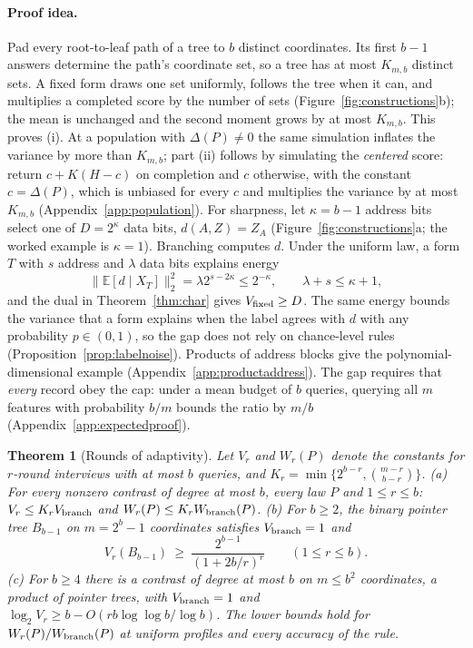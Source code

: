 \documentclass{article}
\newtheorem{theorem}{Theorem}
\newcommand{\E}{\mathbb{E}}
\begin{document}
\paragraph{Proof idea.}
Pad every root-to-leaf path of a tree to $b$ distinct coordinates. Its first $b-1$ answers determine the path's coordinate set, so a tree has at most $K_{m,b}$ distinct sets. A fixed form draws one set uniformly, follows the tree when it can, and multiplies a completed score by the number of sets (Figure~\ref{fig:constructions}b); the mean is unchanged and the second moment grows by at most $K_{m,b}$. This proves (i). At a population with $\Delta(P)\ne0$ the same simulation inflates the variance by more than $K_{m,b}$; part (ii) follows by simulating the \emph{centered} score: return $c+K(H-c)$ on completion and $c$ otherwise, with the constant $c=\Delta(P)$, which is unbiased for every $c$ and multiplies the variance by at most $K_{m,b}$ (Appendix~\ref{app:population}). For sharpness, let $\kappa=b-1$ address bits select one of $D=2^\kappa$ data bits, $d(A,Z)=Z_A$ (Figure~\ref{fig:constructions}a; the worked example is $\kappa=1$). Branching computes $d$. Under the uniform law, a form $T$ with $s$ address and $\lambda$ data bits explains energy
\begin{equation}
 \|\E[d\mid X_T]\|_2^2=\lambda2^{s-2\kappa}\le2^{-\kappa},\qquad \lambda+s\le\kappa+1,\label{eq:addressinformation}
\end{equation}
and the dual in Theorem~\ref{thm:char} gives $V_{\rm fixed}\ge D$. The same energy bounds the variance that a form explains when the label agrees with $d$ with any probability $p\in(0,1)$, so the gap does not rely on chance-level rules (Proposition~\ref{prop:labelnoise}). Products of address blocks give the polynomial-dimensional example (Appendix~\ref{app:productaddress}). The gap requires that \emph{every} record obey the cap: under a mean budget of $b$ queries, querying all $m$ features with probability $b/m$ bounds the ratio by $m/b$ (Appendix~\ref{app:expectedproof}).

\begin{theorem}[Rounds of adaptivity]\label{thm:rounds}
Let $V_r$ and $W_r(P)$ denote the constants for $r$-round interviews with at most $b$ queries, and $K_r=\min\{2^{b-r},\binom{m-r}{b-r}\}$.
\textup{(a)} For every nonzero contrast of degree at most $b$, every law $P$ and $1\le r\le b$: $V_r\le K_rV_{\rm branch}$ and $W_r(P)\le K_rW_{\rm branch}(P)$.
\textup{(b)} For $b\ge2$, the binary pointer tree $B_{b-1}$ on $m=2^b-1$ coordinates satisfies $V_{\rm branch}=1$ and
\[
 V_r(B_{b-1})\ \ge\ \frac{2^{b-1}}{(1+2b/r)^{r}}\qquad(1\le r\le b).
\]
\textup{(c)} For $b\ge4$ there is a contrast of degree at most $b$ on $m\le b^2$ coordinates, a product of pointer trees, with $V_{\rm branch}=1$ and $\log_2V_r\ge b-O(rb\log\log b/\log b)$.
The lower bounds hold for $W_r(P)/W_{\rm branch}(P)$ at uniform profiles and every accuracy of the rule.
\end{theorem}
\end{document}
